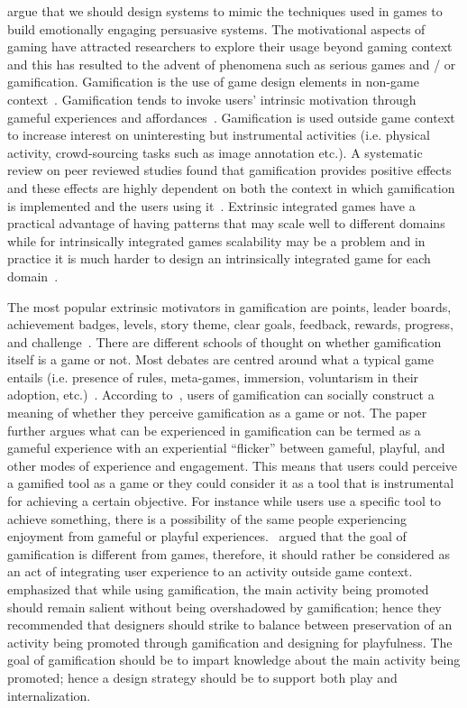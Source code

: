 \cite{nakajima2013designing} argue that we should design systems to mimic the techniques used in games to build emotionally engaging persuasive systems. The motivational aspects of gaming have attracted researchers to explore their usage beyond gaming context and this has resulted to the advent of phenomena such as serious games and / or gamification. Gamification is the use of game design elements in non-game context~\citep{deterding2011game}. Gamification tends to invoke users’ intrinsic motivation through gameful experiences and affordances~\citep{hamari2014persuasive}. Gamification is used outside game context to increase interest on uninteresting but instrumental activities (i.e. physical activity, crowd-sourcing tasks such as image annotation etc.). A systematic review on peer reviewed studies found that gamification provides positive effects and these effects are highly dependent on both the context in which gamification is implemented and the users using it~\citep{hamari2014does}. Extrinsic integrated games have a practical advantage of having patterns that may scale well to different domains while for intrinsically integrated games scalability may be a problem and in practice it is much harder to design an intrinsically integrated game for each domain~\citep{preist2015use}.

The most popular extrinsic motivators in gamification are points, leader boards, achievement badges, levels, story theme, clear goals, feedback, rewards, progress, and challenge~\citep{hamari2014does}. There are different schools of thought on whether gamification itself is a game or not. Most debates are centred around what a typical game entails (i.e. presence of rules, meta-games, immersion, voluntarism in their adoption, etc.)~\citep{seaborn2015:gamification}. According to~\cite{deterding2011game}, users of gamification can socially construct a meaning of whether they perceive gamification as a game or not. The paper further argues what can be experienced in gamification can be termed as a gameful experience with an experiential ``flicker'' between gameful, playful, and other modes of experience and engagement. This means that users could perceive a gamified tool as a game or they could consider it as a tool that is instrumental for achieving a certain objective. For instance while users use a specific tool to achieve something, there is a possibility of the same people experiencing enjoyment from gameful or playful experiences.~\cite{seaborn2015:gamification} argued that the goal of gamification is different from games, therefore, it should rather be considered as an act of integrating user experience to an activity outside game context.~\cite{knaving2013designing} emphasized that while using gamification, the main activity being promoted should remain salient without being overshadowed by gamification; hence they recommended that designers should strike to balance between preservation of an activity being promoted through gamification and designing for playfulness. The goal of gamification should be to impart knowledge about the main activity being promoted; hence a design strategy should be to support both play and internalization.

